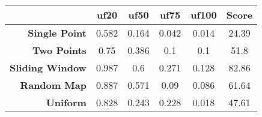 \begin{table}
\centering
\begin{tabular}{r|ccccc} 
\hline
\rowcolor[rgb]{0.69,0.69,0.69}                        & \textbf{uf20} & \textbf{uf50} & \textbf{uf75} & \textbf{uf100} & \textbf{Score}  \\ 
\hline
\textbf{Single Point}                                 & 0.582         & 0.164         & 0.042         & 0.014          & 24.39           \\
\rowcolor[rgb]{0.933,0.933,0.933} \textbf{Two Points} & 0.75          & 0.386         & 0.1           & 0.1            & 51.8            \\
\textbf{Sliding Window}                               & 0.987         & 0.6           & 0.271         & 0.128          & 82.86           \\
\rowcolor[rgb]{0.933,0.933,0.933} \textbf{Random Map} & 0.887         & 0.571         & 0.09          & 0.086          & 61.64           \\
\textbf{Uniform}                                      & 0.828         & 0.243         & 0.228         & 0.018          & 47.61          
\end{tabular}
\end{table}


